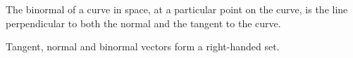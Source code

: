 The binormal of a curve in space, at a particular point on the curve,
is the line perpendicular to both the normal and the tangent to the curve.
\par
Tangent, normal and binormal vectors form a right-handed set.